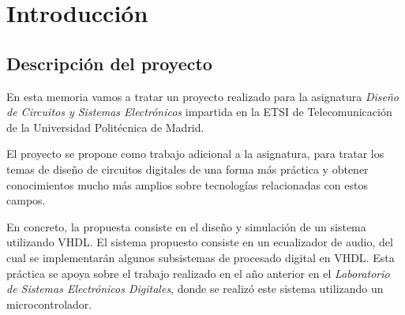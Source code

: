 \documentclass[a4paper,12pt]{report}
\begin{document}
\newcommand\litem[1]{\item{\bfseries #1 }}
\renewcommand{\arraystretch}{1.5} %

\newcommand\headcell[1]{%
  \multicolumn{1}{c|}{\cellcolor{MidnightBlue}\bfseries\sffamily\textcolor{white}{#1}}
}
\newcommand\headcelld[1]{%
  \multicolumn{1}{c||}{\cellcolor{MidnightBlue}\bfseries\sffamily\textcolor{white}{#1}}
}

%




\newpage
\tableofcontents %

\chapter*{Introducción}
\section*{Descripción del proyecto}
En esta memoria vamos a tratar un proyecto realizado para la asignatura \emph{Diseño de Circuitos y Sistemas Electrónicos} impartida en la ETSI de Telecomunicación de la Universidad Politécnica de Madrid.

El proyecto se propone como trabajo adicional a la asignatura, para tratar los temas de diseño de circuitos digitales de una forma más práctica y obtener conocimientos mucho más amplios sobre tecnologías relacionadas con estos campos.

En concreto, la propuesta consiste en el diseño y simulación de un sistema utilizando VHDL. El sistema propuesto consiste en un ecualizador de audio, del cual se implementarán algunos subsistemas de procesado digital en VHDL. Esta práctica se apoya sobre el trabajo realizado en el año anterior en el \emph{Laboratorio de Sistemas Electrónicos Digitales}, donde se realizó este sistema utilizando un microcontrolador.
\end{document}
